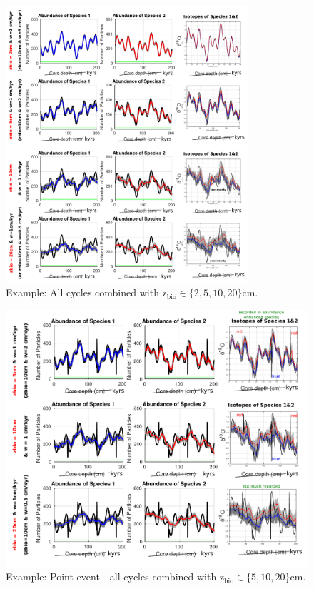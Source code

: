 \documentclass[a4paper,oneside,9pt]{article}
\begin{document}
\begin{figure}[hbp]
\begin{center}
	\includegraphics[width=0.8\textwidth]{../figures/../figures/Allcycles_combined_2+5+10+20cm_background.pdf}
	\caption{Example: All cycles combined with z$_\mathrm{bio} \in \{2,5,10,20 \}$cm.}\label{fig:5pointevent}
\end{center}
\end{figure}


\begin{figure}[hbp]
\begin{center}
	\includegraphics[width=1.0\textwidth]{../figures/../figures/Allcycles_combined_pointevent_5+10+20cm_background.pdf}
	\caption{Example: Point event - all cycles combined with z$_\mathrm{bio} \in \{5,10,20 \}$cm.}\label{fig:5pointevent}
\end{center}
\end{figure}
\begin{figure}[hbtp]
\hspace*{-0.8cm}%
\end{figure}
\end{document}
